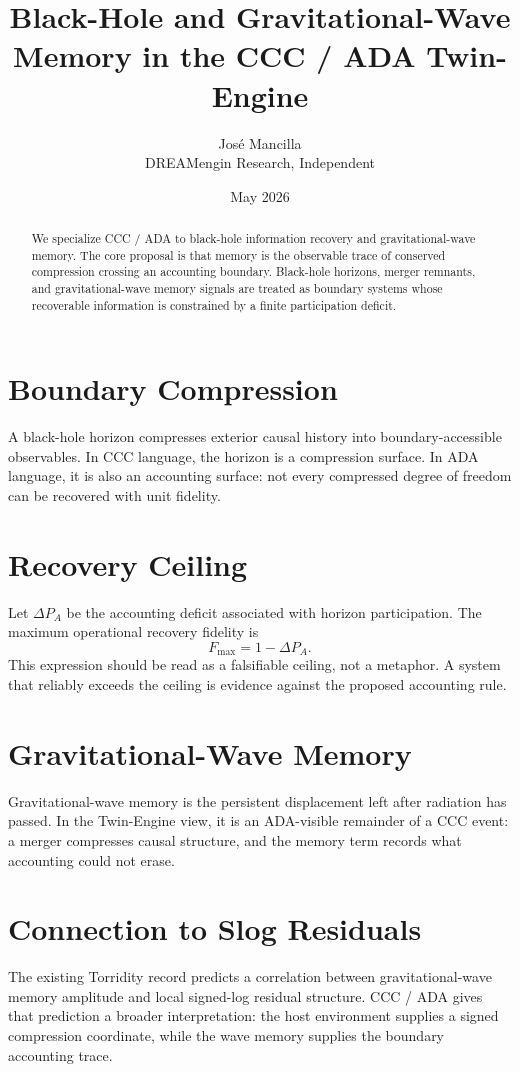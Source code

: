\documentclass[11pt]{article}
\title{Black-Hole and Gravitational-Wave Memory in the CCC / ADA Twin-Engine}
\author{José Mancilla\\DREAMengin Research, Independent}
\date{May 2026}
\begin{document}
\maketitle

\begin{abstract}
We specialize CCC / ADA to black-hole information recovery and gravitational-wave memory. The core proposal is that memory is the observable trace of conserved compression crossing an accounting boundary. Black-hole horizons, merger remnants, and gravitational-wave memory signals are treated as boundary systems whose recoverable information is constrained by a finite participation deficit.
\end{abstract}

\section{Boundary Compression}
A black-hole horizon compresses exterior causal history into boundary-accessible observables. In CCC language, the horizon is a compression surface. In ADA language, it is also an accounting surface: not every compressed degree of freedom can be recovered with unit fidelity.

\section{Recovery Ceiling}
Let $\Delta P_A$ be the accounting deficit associated with horizon participation. The maximum operational recovery fidelity is
\begin{equation}
F_{\max} = 1 - \Delta P_A.
\end{equation}
This expression should be read as a falsifiable ceiling, not a metaphor. A system that reliably exceeds the ceiling is evidence against the proposed accounting rule.

\section{Gravitational-Wave Memory}
Gravitational-wave memory is the persistent displacement left after radiation has passed. In the Twin-Engine view, it is an ADA-visible remainder of a CCC event: a merger compresses causal structure, and the memory term records what accounting could not erase.

\section{Connection to Slog Residuals}
The existing Torridity record predicts a correlation between gravitational-wave memory amplitude and local signed-log residual structure. CCC / ADA gives that prediction a broader interpretation: the host environment supplies a signed compression coordinate, while the wave memory supplies the boundary accounting trace.
\end{document}
